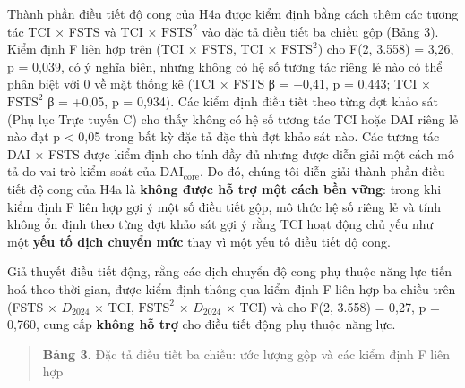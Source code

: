 \documentclass[12pt,a4paper]{article}
\begin{document}
Thành phần điều tiết độ cong của H4a được kiểm định bằng cách thêm các
tương tác TCI × FSTS và TCI × \(\mathrm{FSTS}^2\) vào đặc tả điều tiết
ba chiều gộp (Bảng 3). Kiểm định F liên hợp trên (TCI × FSTS, TCI ×
\(\mathrm{FSTS}^2\)) cho F(2, 3.558) = 3,26, p = 0,039, có ý nghĩa biên,
nhưng không có hệ số tương tác riêng lẻ nào có thể phân biệt với 0 về
mặt thống kê (TCI × FSTS β = −0,41, p = 0,443; TCI × \(\mathrm{FSTS}^2\)
β = +0,05, p = 0,934). Các kiểm định điều tiết theo từng đợt khảo sát
(Phụ lục Trực tuyến C) cho thấy không có hệ số tương tác TCI hoặc DAI
riêng lẻ nào đạt p \textless{} 0,05 trong bất kỳ đặc tả đặc thù đợt khảo
sát nào. Các tương tác DAI × FSTS được kiểm định cho tính đầy đủ nhưng
được diễn giải một cách mô tả do vai trò kiểm soát của
\(\mathrm{DAI}_{\text{core}}\). Do đó, chúng tôi diễn giải thành phần
điều tiết độ cong của H4a là \textbf{không được hỗ trợ một cách bền
vững}: trong khi kiểm định F liên hợp gợi ý một số điều tiết gộp, mô
thức hệ số riêng lẻ và tính không ổn định theo từng đợt khảo sát gợi ý
rằng TCI hoạt động chủ yếu như một \textbf{yếu tố dịch chuyển mức} thay
vì một yếu tố điều tiết độ cong.

Giả thuyết điều tiết động, rằng các dịch chuyển độ cong phụ thuộc năng
lực tiến hoá theo thời gian, được kiểm định thông qua kiểm định F liên
hợp ba chiều trên (FSTS × \(D_{2024}\) × TCI, \(\mathrm{FSTS}^2\) ×
\(D_{2024}\) × TCI) và cho F(2, 3.558) = 0,27, p = 0,760, cung cấp
\textbf{không hỗ trợ} cho điều tiết động phụ thuộc năng lực.

\begin{quote}
\textbf{Bảng 3.} Đặc tả điều tiết ba chiều: ước lượng gộp và các kiểm
định F liên hợp
\end{quote}
\end{document}

